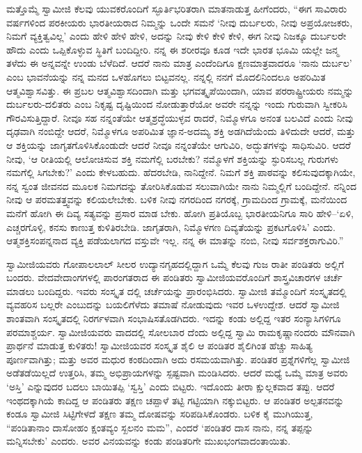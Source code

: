 ಮತ್ತೊಮ್ಮೆ ಸ್ವಾಮೀಜಿ ಕೆಲವು ಯುವಕರೊಂದಿಗೆ ಸ್ಫೂರ್ತಿಭರಿತರಾಗಿ ಮಾತನಾಡುತ್ತ ಹೀಗೆಂದರು, “ಈಗ ಸಾವಿರಾರು ವರ್ಷಗಳಿಂದ ಪರಕೀಯರು ಭಾರತೀಯರಾದ ನಿಮ್ಮನ್ನು ಒಂದೇ ಸಮನೆ ‘ನೀವು ದುರ್ಬಲರು, ನೀವು ಅಪ್ರಯೋಜಕರು, ನಿಮಗೆ ವ್ಯಕ್ತಿತ್ವವಿಲ್ಲ’ ಎಂದು ಹೇಳಿ ಹೇಳಿ ಹೇಳಿ, ಅದನ್ನು ನೀವು ಕೇಳಿ ಕೇಳಿ ಕೇಳಿ, ಈಗ ನೀವು ನಿಜಕ್ಕೂ ದುರ್ಬಲರೇ ಹೌದು ಎಂದು ಒಪ್ಪಿಕೊಳ್ಳುವ ಸ್ಥಿತಿಗೆ ಬಂದಿದ್ದೀರಿ. ನನ್ನ ಈ ಶರೀರವೂ ಕೂಡ ಇದೇ ಭಾರತ ಭೂಮಿ ಯಲ್ಲೇ ಜನ್ಮ ತಳೆದು ಈ ಅನ್ನವನ್ನೇ ಉಂಡು ಬೆಳೆದಿದೆ. ಆದರೆ ನಾನು ಮಾತ್ರ ಎಂದೆಂದಿಗೂ ಕ್ಷಣಮಾತ್ರವಾದರೂ ‘ನಾನು ದುರ್ಬಲ’ ಎಂಬ ಭಾವನೆಯನ್ನು ನನ್ನ ಮನದ ಒಳಹೊಗಲು ಬಿಟ್ಟವನಲ್ಲ. ನನ್ನಲ್ಲಿ ನನಗೆ ಮೊದಲಿನಿಂದಲೂ ಅಪರಿಮಿತ ಆತ್ಮವಿಶ್ವಾಸವಿತ್ತು. ಈ ಪ್ರಬಲ ಆತ್ಮವಿಶ್ವಾಸದಿಂದಾಗಿ ಮತ್ತು ಭಗವತ್ಕೃಪೆಯಿಂದಾಗಿ, ಯಾವ ಪರರಾಷ್ಟ್ರೀಯರು ನಮ್ಮನ್ನು ದುರ್ಬಲರು-ದಲಿತರು ಎಂಬ ನಿಕೃಷ್ಟ ದೃಷ್ಟಿಯಿಂದ ನೋಡುತ್ತಾರೆಯೋ ಅವರೇ ನನ್ನನ್ನು ಇಂದು ಗುರುವಾಗಿ ಸ್ವೀಕರಿಸಿ ಗೌರವಿಸುತ್ತಿದ್ದಾರೆ. ನೀವೂ ಸಹ ನನ್ನಂತೆಯೇ ಆತ್ಮಶ್ರದ್ಧೆಯುಳ್ಳವ ರಾದರೆ, ನಿಮ್ಮೊಳಗೂ ಅನಂತ ಬಲವಿದೆ ಎಂದು ನೀವು ದೃಢವಾಗಿ ನಂಬಿದ್ದೇ ಆದರೆ, ನಿಮ್ಮೊಳಗೂ ಅಪರಿಮಿತ ಜ್ಞಾನ-ಅದಮ್ಯ ಶಕ್ತಿ ಅಡಗಿದೆಯೆಂದು ತಿಳಿದುದೇ ಆದರೆ, ಮತ್ತು ಆ ಶಕ್ತಿಯನ್ನು ಜಾಗೃತಗೊಳಿಸಿಕೊಂಡುದೇ ಆದರೆ ನೀವೂ ನನ್ನಂತೆಯೇ ಆಗುವಿರಿ, ಅದ್ಭುತಗಳನ್ನು ಸಾಧಿಸುವಿರಿ. ಆದರೆ ನೀವು, ‘ಆ ರೀತಿಯಲ್ಲಿ ಆಲೋಚಿಸುವ ಶಕ್ತಿ ನಮಗೆಲ್ಲಿ ಬರಬೇಕು? ನಮ್ಮೊಳಗೆ ಶಕ್ತಿಯನ್ನು ಸ್ಫುರಿಸಬಲ್ಲ ಗುರುಗಳು ನಮಗೆಲ್ಲಿ ಸಿಗಬೇಕು?’ ಎಂದು ಕೇಳಬಹುದು. ಹೆದರಬೇಡಿ, ನಾನಿದ್ದೇನೆ. ನಿಮಗೆ ಶಕ್ತಿ ಪಾಠವನ್ನು ಕಲಿಸುವುದಕ್ಕಾಗಿಯೇ, ನನ್ನ ಸ್ವಂತ ಜೀವನದ ಮೂಲಕ ನಿಮಗದನ್ನು ತೋರಿಸಿಕೊಡುವ ಸಲುವಾಗಿಯೇ ನಾನು ನಿಮ್ಮಲ್ಲಿಗೆ ಬಂದಿದ್ದೇನೆ. ನನ್ನಿಂದ ನೀವು ಆ ಪರಮತತ್ತ್ವವನ್ನು ಕಲಿಯಲೇಬೇಕು. ಬಳಿಕ ನೀವು ನಗರದಿಂದ ನಗರಕ್ಕೆ, ಗ್ರಾಮದಿಂದ ಗ್ರಾಮಕ್ಕೆ, ಮನೆಯಿಂದ ಮನೆಗೆ ಹೋಗಿ ಈ ದಿವ್ಯ ಸತ್ಯವನ್ನು ಪ್ರಸಾರ ಮಾಡ ಬೇಕು. ಹೋಗಿ ಪ್ರತಿಯೊಬ್ಬ ಭಾರತೀಯನಿಗೂ ಸಾರಿ ಹೇಳಿ–‘ಏಳಿ, ಎಚ್ಚರಗೊಳ್ಳಿ, ಕನಸು ಕಾಣುತ್ತ ಕುಳಿತಿರಬೇಡಿ. ಜಾಗೃತರಾಗಿ, ನಿಮ್ಮೊಳಗಣ ದಿವ್ಯತೆಯನ್ನು ಪ್ರಕಟಗೊಳಿಸಿ’ ಎಂದು. ಆತ್ಮಶಕ್ತಿಸಂಪನ್ನನಾದ ವ್ಯಕ್ತಿ ಪಡೆಯಲಾಗದ ವಸ್ತುವೇ ಇಲ್ಲ. ನನ್ನ ಈ ಮಾತನ್ನು ನಂಬಿ, ನೀವು ಸರ್ವಶಕ್ತರಾಗುವಿರಿ.”

ಸ್ವಾಮೀಜಿಯವರು ಗೋಪಾಲಲಾಲ್ ಸೀಲರ ಉದ್ಯಾನಗೃಹದಲ್ಲಿದ್ದಾಗ ಒಮ್ಮೆ ಕೆಲವು ಗುಜ ರಾತೀ ಪಂಡಿತರು ಅಲ್ಲಿಗೆ ಬಂದರು. ವೇದವೇದಾಂಗಗಳಲ್ಲಿ ಪಾರಂಗತರಾದ ಈ ಪಂಡಿತರು ಸ್ವಾಮೀಜಿಯವರೊಂದಿಗೆ ಶಾಸ್ತ್ರವಿಚಾರಗಳ ಚರ್ಚೆ ಮಾಡಲು ಬಂದಿದ್ದರು. ಇವರು ಸಂಸ್ಕೃತ ದಲ್ಲಿ ಚರ್ಚೆಯನ್ನು ಪ್ರಾರಂಭಿಸಿದರು. ಸ್ವಾಮೀಜಿ ತಮ್ಮೊಂದಿಗೆ ಸಂಸ್ಕೃತದಲ್ಲಿ ವ್ಯವಹರಿಸ ಬಲ್ಲರೇ ಎಂಬುದನ್ನು ಬಯಲಿಗೆಳೆದು ತಮಾಷೆ ನೋಡುವುದು ಇವರ ಒಳಉದ್ದೇಶ. ಆದರೆ ಸ್ವಾಮೀಜಿ ಶಾಂತವಾಗಿ ಸಂಸ್ಕೃತದಲ್ಲಿ ನಿರರ್ಗಳವಾಗಿ ಸಂಭಾಷಿಸತೊಡಗಿದರು. ಇದನ್ನು ಕಂಡು ಅಲ್ಲಿದ್ದ ಇತರ ಸಂನ್ಯಾಸಿಗಳಿಗೂ ಪರಮಾಶ್ಚರ್ಯ. ಸ್ವಾಮೀಜಿಯವರು ವಾದದಲ್ಲಿ ಸೋಲಬಾರ ದೆಂದು ಅಲ್ಲಿದ್ದ ಸ್ವಾಮಿ ರಾಮಕೃಷ್ಣಾನಂದರು ಮೌನವಾಗಿ ಪ್ರಾರ್ಥನೆ ಮಾಡುತ್ತ ಕುಳಿತರು! ಸ್ವಾಮೀಜಿಯವರ ಸಂಸ್ಕೃತ ಶೈಲಿ ಆ ಪಂಡಿತರ ಶೈಲಿಗಿಂತ ಹೆಚ್ಚು ಸಾಹಿತ್ಯ ಪೂರ್ಣವಾಗಿತ್ತು; ಮತ್ತು ಅವರ ಮಧುರ ಕಂಠದಿಂದಾಗಿ ಅದು ರಸಮಯವಾಗಿತ್ತು. ಪಂಡಿತರ ಪ್ರಶ್ನೆಗಳಿಗೆಲ್ಲ ಸ್ವಾಮೀಜಿ ಅಡೆತಡೆಯಿಲ್ಲದೆ ಉತ್ತರಿಸಿ, ತಮ್ಮ ಅಭಿಪ್ರಾಯಗಳನ್ನು ಸ್ಪಷ್ಟವಾಗಿ ಮಂಡಿಸಿದರು. ಆದರೆ ಮಧ್ಯೆ ಒಮ್ಮೆ ಮಾತ್ರ ಅವರು ‘ಅಸ್ತಿ’ ಎನ್ನುವುದರ ಬದಲು ಬಾಯಿತಪ್ಪಿ ‘ಸ್ವಸ್ತಿ’ ಎಂದು ಬಿಟ್ಟರು. ಇದೊಂದು ತೀರಾ ಕ್ಷುಲ್ಲಕವಾದ ತಪ್ಪು. ಆದರೆ ಇಂಥದಕ್ಕಾಗಿಯೆ ಕಾದಿದ್ದ ಆ ಪಂಡಿತರು ತಕ್ಷಣ ಚಪ್ಪಾಳೆ ತಟ್ಟಿ ಗಟ್ಟಿಯಾಗಿ ನಕ್ಕುಬಿಟ್ಟರು. ಆ ಪಂಡಿತರ ಅಲ್ಪತನವನ್ನು ಕಂಡೂ ಸ್ವಾಮೀಜಿ ಸಿಟ್ಟಿಗೇಳದೆ ತಕ್ಷಣ ತಮ್ಮ ದೋಷವನ್ನು ಸರಿಪಡಿಸಿಕೊಂಡರು. ಬಳಿಕ ಕೈ ಮುಗಿಯುತ್ತ, “ಪಂಡಿತಾನಾಂ ದಾಸೋಹಂ ಕ್ಷಂತವ್ಯಂ ಸ್ಖಲನಂ ಮಮ”, ಎಂದರೆ ‘ಪಂಡಿತರ ದಾಸ ನಾನು, ನನ್ನ ತಪ್ಪನ್ನು ಮನ್ನಿಸಬೇಕು’ ಎಂದರು. ಅವರ ವಿನಯವನ್ನು ಕಂಡು ಪಂಡಿತರಿಗೇ ಮುಖಭಂಗವಾದಂತಾಯಿತು.

